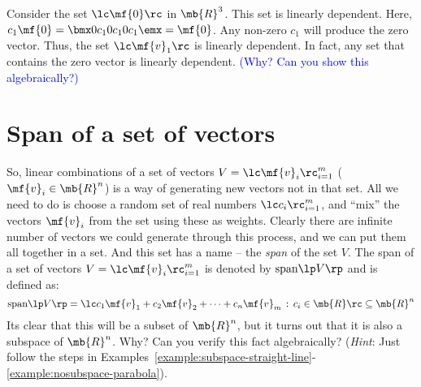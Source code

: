 \begin{boxedstuff}
    \begin{example}
        Consider the set $\lc \mf{0} \rc$ in $\mb{R}^3$. This set is linearly dependent. Here, $c_1 \mf{0} = \bmx 0 c_1 \\ 0 c_1 \\ 0 c_1 \emx = \mf{0}$. Any non-zero $c_1$ will produce the zero vector. Thus, the set $\lc \mf{v}_1 \rc$ is linearly dependent. In fact, any set that contains the zero vector is linearly dependent. \textcolor{blue}{(Why? Can you show this algebraically?)}
    \end{example}
\end{boxedstuff}

\section{Span of a set of vectors}\label{sec:ch01-span}
So, linear combinations of a set of vectors $V = \lc \mf{v}_i \rc_{i=1}^{m}$ ($\mf{v}_i \in \mb{R}^n$) is a way of generating new vectors not in that set. All we need to do is choose a random set of real numbers $\lc c_i \rc_{i=1}^{m}$, and ``mix'' the vectors $\mf{v}_i$ from the set using these as weights. Clearly there are infinite number of vectors we could generate through this process, and we can put them all together in a set. And this set has a name -- the \textit{span} of the set $V$. The span of a set of vectors $V = \lc \mf{v}_i \rc_{i=1}^{m}$ is denoted by $\text{span}\lp V \rp$ and is defined as:
\begin{equation}
    \text{span}\lp V \rp = \lc c_1 \mf{v}_1 + c_2 \mf{v}_2 + \cdots + c_n \mf{v}_m \, : \, c_i \in \mb{R} \rc \subseteq \mb{R}^n
    \label{eq:span-vec}
\end{equation}
Its clear that this will be a subset of $\mb{R}^n$, but it turns out that it is also a subspace of $\mb{R}^n$. Why? Can you verify this fact algebraically? (\textit{Hint}: Just follow the steps in Examples~\ref{example:subspace-straight-line}-\ref{example:nosubspace-parabola}).


